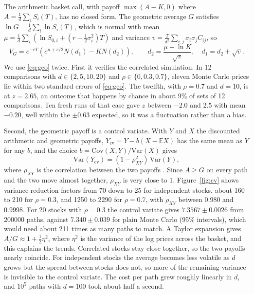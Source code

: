 \documentclass[11pt,a4paper]{article}
\newcommand{\E}{\mathbb{E}}
\begin{document}
The arithmetic basket call, with payoff $\max(A - K, 0)$ where $A = \frac{1}{d}\sum_iS_i(T)$, has no closed form. The geometric average $G$ satisfies $\ln G = \frac{1}{d}\sum_i\ln S_i(T)$, which is normal with mean $\mu = \frac{1}{d}\sum_i(\ln S_{0,i} + (r - \frac{1}{2}\sigma_i^2)T)$ and variance $v = \frac{T}{d^2}\sum_{i,j}\sigma_i\sigma_jC_{ij}$, so
\begin{equation}
V_G = e^{-rT}\left(e^{\mu + v/2}N(d_1) - KN(d_2)\right), \qquad d_2 = \frac{\mu - \ln K}{\sqrt{v}}, \quad d_1 = d_2 + \sqrt{v}. \label{eq:geo}
\end{equation}
We use \eqref{eq:geo} twice. First it verifies the correlated simulation. In 12 comparisons with $d \in \{2, 5, 10, 20\}$ and $\rho \in \{0, 0.3, 0.7\}$, eleven Monte Carlo prices lie within two standard errors of \eqref{eq:geo}. The twelfth, with $\rho = 0.7$ and $d = 10$, is at $z = 2.65$, an outcome that happens by chance in about 9\% of sets of 12 comparisons. Ten fresh runs of that case gave $z$ between $-2.0$ and $2.5$ with mean $-0.20$, well within the $\pm0.63$ expected, so it was a fluctuation rather than a bias.

Second, the geometric payoff is a control variate. With $Y$ and $X$ the discounted arithmetic and geometric payoffs, $Y_{\mathrm{cv}} = Y - b(X - \E X)$ has the same mean as $Y$ for any $b$, and the choice $b = \mathrm{Cov}(X,Y)/\mathrm{Var}(X)$ gives
\begin{equation}
\mathrm{Var}(Y_{\mathrm{cv}}) = (1 - \rho_{XY}^2)\,\mathrm{Var}(Y),
\end{equation}
where $\rho_{XY}$ is the correlation between the two payoffs \citep{kemna1990}. Since $A \ge G$ on every path and the two move almost together, $\rho_{XY}$ is very close to 1. Figure~\ref{fig:cv} shows variance reduction factors from 70 down to 25 for independent stocks, about 160 to 210 for $\rho = 0.3$, and 1250 to 2290 for $\rho = 0.7$, with $\rho_{XY}$ between 0.980 and 0.9998. For 20 stocks with $\rho = 0.3$ the control variate gives $7.3567 \pm 0.0026$ from 200000 paths, against $7.340 \pm 0.039$ for plain Monte Carlo (95\% intervals), which would need about 211 times as many paths to match. A Taylor expansion gives $A/G \approx 1 + \frac{1}{2}\eta^2$, where $\eta^2$ is the variance of the log prices across the basket, and this explains the trends. Correlated stocks stay close together, so the two payoffs nearly coincide. For independent stocks the average becomes less volatile as $d$ grows but the spread between stocks does not, so more of the remaining variance is invisible to the control variate. The cost per path grew roughly linearly in $d$, and $10^5$ paths with $d = 100$ took about half a second.
\end{document}
